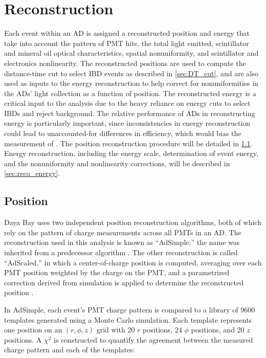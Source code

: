 \chapter{Reconstruction}
\label{ch:reconstruction}

Each event within an AD is assigned a reconstructed position and energy
that take into account the pattern of PMT hits, the total light emitted,
scintillator and mineral oil optical characteristics,
spatial nonuniformity, and scintillator and electronics nonlinearity.
The reconstructed positions are used to compute the distance-time cut
to select IBD events as described in \cref{sec:DT_cut},
and are also used as inputs to the energy reconstruction
to help correct for nonuniformities in the ADs' light collection
as a function of position.
The reconstructed energy is a critical input to the \thetaot{} analysis
due to the heavy reliance on energy cuts to select IBDs and reject background.
The relative performance of ADs in reconstructing energy
is particularly important, since inconsistencies in energy reconstruction
could lead to unaccounted-for differences in efficiency,
which would bias the measurement of \thetaot.
The position reconstruction procedure will be detailed in \cref{sec:reco_position}.
Energy reconstruction, including the energy scale, determination of event energy,
and the nonuniformity and nonlinearity corrections,
will be described in \cref{sec:reco_energy}.

\section{Position}
\label{sec:reco_position}

Daya Bay uses two independent position reconstruction algorithms,
both of which rely on the pattern of charge measurements across all PMTs in an AD.
The reconstruction used in this \thetaot{} analysis is known as ``AdSimple;''
the name was inherited from a predecessor algorithm \cite{adsimple1}.
The other reconstruction is called ``AdScaled,''
in which a center-of-charge position is computed,
averaging over each PMT position weighted by the charge on the PMT,
and a parametrized correction derived from simulation
is applied to determine the reconstructed position \cite{ngd2016}.

In AdSimple,
each event's PMT charge pattern is compared to a library of \num{9600} templates
generated using a Monte Carlo simulation.
Each template represents one position on an $(r, \phi, z)$ grid
with \num{20} $r$ positions, \num{24} $\phi$ positions,
and \num{20} $z$ positions.
A $\chi^2$ is constructed to quantify the agreement between the measured charge pattern
and each of the templates:

